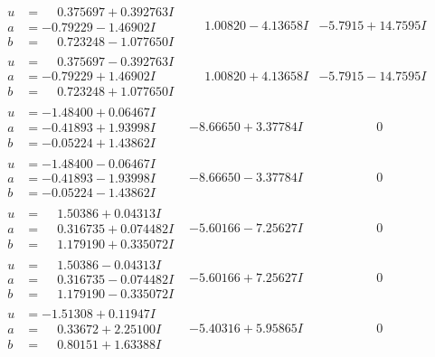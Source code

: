 \documentclass[1p]{elsarticle_modified}
\theoremstyle{definition}
\begin{document}
$$\begin{array}{c|c|c}
\begin{aligned}
u &= \phantom{-}0.375697 + 0.392763 I \\
a &= -0.79229 - 1.46902 I \\
b &= \phantom{-}0.723248 - 1.077650 I\end{aligned}
 & \phantom{-}1.00820 - 4.13658 I & -5.7915 + 14.7595 I \\ \hline\begin{aligned}
u &= \phantom{-}0.375697 - 0.392763 I \\
a &= -0.79229 + 1.46902 I \\
b &= \phantom{-}0.723248 + 1.077650 I\end{aligned}
 & \phantom{-}1.00820 + 4.13658 I & -5.7915 - 14.7595 I \\ \hline\begin{aligned}
u &= -1.48400 + 0.06467 I \\
a &= -0.41893 + 1.93998 I \\
b &= -0.05224 + 1.43862 I\end{aligned}
 & -8.66650 + 3.37784 I & \phantom{-0.000000 } 0 \\ \hline\begin{aligned}
u &= -1.48400 - 0.06467 I \\
a &= -0.41893 - 1.93998 I \\
b &= -0.05224 - 1.43862 I\end{aligned}
 & -8.66650 - 3.37784 I & \phantom{-0.000000 } 0 \\ \hline\begin{aligned}
u &= \phantom{-}1.50386 + 0.04313 I \\
a &= \phantom{-}0.316735 + 0.074482 I \\
b &= \phantom{-}1.179190 + 0.335072 I\end{aligned}
 & -5.60166 - 7.25627 I & \phantom{-0.000000 } 0 \\ \hline\begin{aligned}
u &= \phantom{-}1.50386 - 0.04313 I \\
a &= \phantom{-}0.316735 - 0.074482 I \\
b &= \phantom{-}1.179190 - 0.335072 I\end{aligned}
 & -5.60166 + 7.25627 I & \phantom{-0.000000 } 0 \\ \hline\begin{aligned}
u &= -1.51308 + 0.11947 I \\
a &= \phantom{-}0.33672 + 2.25100 I \\
b &= \phantom{-}0.80151 + 1.63388 I\end{aligned}
 & -5.40316 + 5.95865 I & \phantom{-0.000000 } 0 \\ \hline\begin{aligned}

\end{aligned}
\end{array}$$
\end{document}
